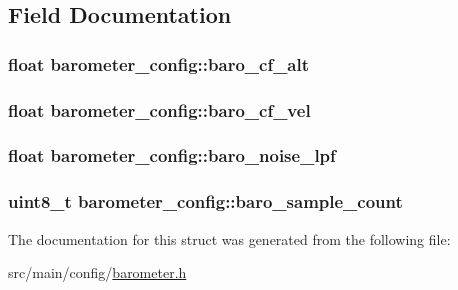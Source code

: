 \subsection{Field Documentation}
\hypertarget{structbarometer__config_a32526c74744f31df1377cafc6657be09}{
\subsubsection[{baro\+\_\+cf\+\_\+alt}]{\setlength{\rightskip}{0pt plus 5cm}float barometer\+\_\+config\+::baro\+\_\+cf\+\_\+alt}}\label{structbarometer__config_a32526c74744f31df1377cafc6657be09}
\hypertarget{structbarometer__config_a66e70e2f183334f120a00902347550d6}{
\subsubsection[{baro\+\_\+cf\+\_\+vel}]{\setlength{\rightskip}{0pt plus 5cm}float barometer\+\_\+config\+::baro\+\_\+cf\+\_\+vel}}\label{structbarometer__config_a66e70e2f183334f120a00902347550d6}
\hypertarget{structbarometer__config_a0b39f2fd05190ad19ea7720ccb908022}{
\subsubsection[{baro\+\_\+noise\+\_\+lpf}]{\setlength{\rightskip}{0pt plus 5cm}float barometer\+\_\+config\+::baro\+\_\+noise\+\_\+lpf}}\label{structbarometer__config_a0b39f2fd05190ad19ea7720ccb908022}
\hypertarget{structbarometer__config_a6b0aeed30705021ffd927c75463b8e55}{
\subsubsection[{baro\+\_\+sample\+\_\+count}]{\setlength{\rightskip}{0pt plus 5cm}uint8\+\_\+t barometer\+\_\+config\+::baro\+\_\+sample\+\_\+count}}\label{structbarometer__config_a6b0aeed30705021ffd927c75463b8e55}


The documentation for this struct was generated from the following file\+:\begin{DoxyCompactItemize}
\item 
src/main/config/\hyperlink{config_2barometer_8h}{barometer.\+h}\end{DoxyCompactItemize}
